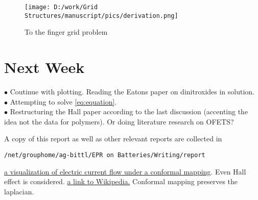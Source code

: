 \documentclass[12pt,a4paper]{report}
\newcommand{\sectionline}[2]{%
  \nointerlineskip \vspace{.5\baselineskip}\hspace{\fill}
  {\color{#1}
    \resizebox{0.5\linewidth}{2ex}
    {{%
    {\begin{tikzpicture}
    \node  (C) at (0,0) {};
    \node (D) at (9,0) {};
    \path (C) to [ornament=#2] (D);
    \end{tikzpicture}}}}}%
    \hspace{\fill}
    \par\nointerlineskip \vspace{.5\baselineskip}
  }
\begin{document}
\begin{figure} [!ht]
\begin{center}
       \texttt{[image: D:/work/Grid Structures/manuscript/pics/derivation.png]}
       \end{center}
\caption{To the finger grid problem}
     \label{fig:long_redox}
\end{figure}



\section{Next Week}
$\bullet$ Coutinue with plotting. Reading the Eatons paper on dinitroxides in solution.\\
$\bullet$ Attempting to solve \ref{eq:equation}.\\
$\bullet$ Restructuring the Hall paper according to the last discussion (accenting the idea not the data for polymers). Or doing literature research on OFETS?\\


\par A copy of this report as well as other relevant reports are collected in \begin{verbatim}
/net/grouphome/ag-bittl/EPR on Batteries/Writing/report
\end{verbatim} 

\begin{thebibliography}{999}
 \href{http://www.bru.hlphys.jku.at/conf_map/index.html} {a visualization of electric current flow under a conformal mapping}. Even Hall effect is considered.
 \href{https://en.wikipedia.org/wiki/Conformal_map#Physics_and_engineering} {a link to Wikipedia.} Conformal mapping preserves the laplacian.


\end{thebibliography}
\end{document}
